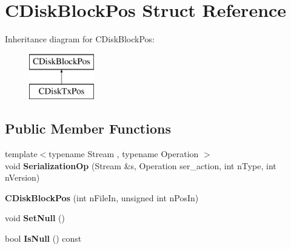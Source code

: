 \hypertarget{struct_c_disk_block_pos}{}\section{C\+Disk\+Block\+Pos Struct Reference}
\label{struct_c_disk_block_pos}
Inheritance diagram for C\+Disk\+Block\+Pos\+:\begin{figure}[H]
\begin{center}
\leavevmode
\includegraphics[height=2.000000cm]{struct_c_disk_block_pos}
\end{center}
\end{figure}
\subsection*{Public Member Functions}
\begin{DoxyCompactItemize}
\item 
\mbox{\label{struct_c_disk_block_pos_a821bb4eebc99ae39c20133d80244325f}} 
{\footnotesize template$<$typename Stream , typename Operation $>$ }\\void {\bfseries Serialization\+Op} (Stream \&s, Operation ser\+\_\+action, int n\+Type, int n\+Version)
\item 
\mbox{\label{struct_c_disk_block_pos_a0c96947d09bb4aaf28ab2d7866d20918}} 
{\bfseries C\+Disk\+Block\+Pos} (int n\+File\+In, unsigned int n\+Pos\+In)
\item 
\mbox{\label{struct_c_disk_block_pos_a0a6ba113219a456472081ee6d6b20a72}} 
void {\bfseries Set\+Null} ()
\item 
\mbox{\label{struct_c_disk_block_pos_a7dd98fe3f5372d358df61db31899b0af}} 
bool {\bfseries Is\+Null} () const
\end{DoxyCompactItemize}
